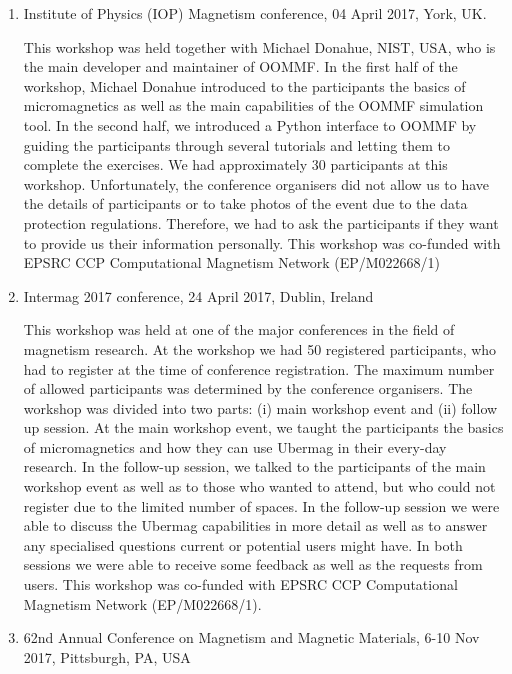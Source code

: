 \documentclass{deliverablereport}
\begin{document}
\begin{enumerate}
  
\item Institute of Physics (IOP) Magnetism conference, 04 April 2017, York, UK.

  This workshop was held together with Michael Donahue, NIST, USA, who is the main developer and maintainer of OOMMF. In the first half of the workshop, Michael Donahue introduced to the participants the basics of micromagnetics as well as the main capabilities of the OOMMF simulation tool. In the second half, we introduced a Python interface to OOMMF by guiding the participants through several tutorials and letting them to complete the exercises. We had approximately 30 participants at this workshop. Unfortunately, the conference organisers did not allow us to have the details of participants or to take photos of the event due to the data protection regulations. Therefore, we had to ask the participants if they want to provide us their information personally. This workshop was co-funded with EPSRC CCP Computational Magnetism Network (EP/M022668/1)

\item Intermag 2017 conference, 24 April 2017, Dublin, Ireland

  This workshop was held at one of the major conferences in the field of magnetism research. At the workshop we had 50 registered participants, who had to register at the time of conference registration. The maximum number of allowed participants was determined by the conference organisers. The workshop was divided into two parts: (i) main workshop event and (ii) follow up session. At the main workshop event, we taught the participants the basics of micromagnetics and how they can use Ubermag in their every-day research. In the follow-up session, we talked to the participants of the main workshop event as well as to those who wanted to attend, but who could not register due to the limited number of spaces. In the follow-up session we were able to discuss the Ubermag capabilities in more detail as well as to answer any specialised questions current or potential users might have. In both sessions we were able to receive some feedback as well as the requests from users. This workshop was co-funded with EPSRC CCP Computational Magnetism Network (EP/M022668/1).
  
  \item 62nd Annual Conference on Magnetism and Magnetic Materials, 6-10 Nov 2017, Pittsburgh, PA, USA


\end{enumerate}
\end{document}
